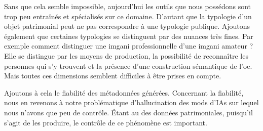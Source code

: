 Sans que cela semble impossible, aujourd'hui les outils que nous possédons sont trop peu entraînés et spécialisés sur ce domaine. D'autant que la typologie d'un objet patrimonial peut ne pas correspondre à une typologie publique. Ajoutons également que certaines typologies se distinguent par des nuances très fines. Par exemple comment distinguer une \gls{imgani} professionnelle d'une \gls{imgani} amateur ? Elle se distingue par les moyens de production, la possibilité de reconnaître les personnes qui s'y trouvent et la présence d'une construction sémantique de l'\gls{oe}. Mais toutes ces dimensions semblent difficiles à être prises en compte.

Ajoutons à cela le fiabilité des métadonnées générées. Concernant la fiabilité, nous en revenons à notre problématique d'hallucination des \glspl{mod} d'\glspl{IA} sur lequel nous n'avons que peu de contrôle. Étant au \coeur des données patrimoniales, puisqu'il s'agit de les produire, le contrôle de ce phénomène est important.\newline